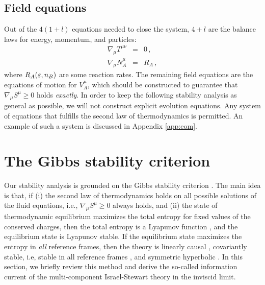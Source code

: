 \documentclass[
a4paper,
amsfonts,
amsmath,
reprint,
showkeys,
nofootinbib,
twoside,
onecolumn,
notitlepage
]{revtex4-1}
\begin{document}
	\subsection{Field equations}
	\label{sec:field-eqs}
	
	
	Out of the $4(1{+}l)$ equations needed to close the system, $4{+}l$ are the balance laws for energy, momentum, and particles:
	\begin{subequations}\label{eq:eom}
		\begin{eqnarray}
			\label{eq:eom-em}
			\nabla_\mu T^{\mu \nu}&=& 0 \, , \\
			\label{eq:eom-n}
			\nabla_\mu N_A^\mu &=& R_A \, ,
		\end{eqnarray}    
	\end{subequations}
	where $R_A(\varepsilon,n_B)$ are some reaction rates. 
	The remaining field equations are the equations of motion for $V_A^\mu$, which should be constructed to guarantee that $\nabla_\mu S^\mu \geq 0$ \cite{Israel_2009_inbook} holds \textit{exactly}. 
	In order to keep the following stability analysis as general as possible, we will not construct explicit evolution equations.  
	Any system of equations that fulfills the second law of thermodynamics is permitted.
	An example of such a system is discussed in Appendix \ref{app:eom}.
	\section{The Gibbs stability criterion}\label{sec:gibbs}
	
	Our stability analysis is grounded on the Gibbs stability criterion \cite{GavassinoGibbs2021,PrigoginebookModernThermodynamics2014,GavassinoGENERIC2022}. 
	The main idea is that, if (i) the second law of thermodynamics holds on all possible solutions of the fluid equations, i.e., $\nabla_\mu S^\mu \geq 0$ always holds, and (ii) the state of thermodynamic equilibrium maximizes the total entropy for fixed values of the conserved charges, then the total entropy is a Lyapunov function \cite{lasalle1961stability}, and the equilibrium state is Lyapunov stable. 
	If the equilibrium state maximizes the entropy in \textit{all} reference frames, then the theory is linearly causal \cite{GavassinoCausality2021}, covariantly stable, i.e, stable in all reference frames \cite{GavassinoSuperluminal2021,GavassinoBounds2023}, and symmetric hyperbolic \cite{GavassinoUniversality2023,GavassinoCasimir2023,GavassinoNonHydro2022}. 
	In this section, we briefly review this method and derive the so-called information current of the multi-component Israel-Stewart theory in the inviscid limit.
	
\end{document}
